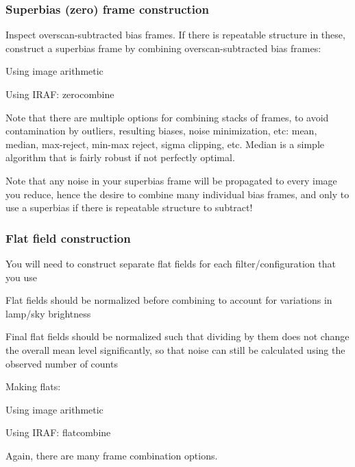 \documentclass{article}
\begin{document}
\subsubsection*{Superbias (zero) frame construction}
\begin{itemize*}
    \item Inspect overscan-subtracted bias frames. If there is repeatable
        structure in these, construct a superbias frame by combining
        overscan-subtracted bias frames:
        \begin{itemize*}
            \item Using image arithmetic
            \item Using IRAF: zerocombine
            \item Note that there are multiple options for combining stacks of frames,
                to avoid contamination by outliers, resulting biases, noise
                minimization, etc: mean, median, max-reject, min-max reject, sigma
                clipping, etc. Median is a simple algorithm that is fairly robust if
                not perfectly optimal.
        \end{itemize*}
    \item Note that any noise in your superbias frame will be propagated to
        every image you reduce, hence the desire to combine many individual
        bias frames, and only to use a superbias if there is repeatable
        structure to subtract!
\end{itemize*}

\subsubsection*{Flat field construction}
\begin{itemize*}
    \item You will need to construct separate flat fields for each
        filter/configuration that you use
    \item Flat fields should be normalized before combining to account for
        variations in lamp/sky brightness
    \item Final flat fields should be normalized such that dividing by
        them does not change the overall mean level significantly,
        so that noise can still be calculated using the observed number
        of counts
    \item Making flats:
        \begin{itemize*}
            \item Using image arithmetic
            \item Using IRAF: flatcombine
            \item Again, there are many frame combination options.
        \end{itemize*}
\end{itemize*}
\end{document}
